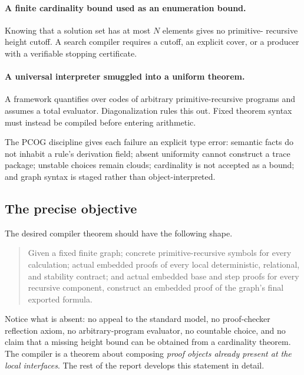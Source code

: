 \paragraph{A finite cardinality bound used as an enumeration bound.}
Knowing that a solution set has at most \(N\) elements gives no primitive-
recursive height cutoff.  A search compiler requires a cutoff, an explicit
cover, or a producer with a verifiable stopping certificate.

\paragraph{A universal interpreter smuggled into a uniform theorem.}
A framework quantifies over codes of arbitrary primitive-recursive programs
and assumes a total evaluator.  Diagonalization rules this out.  Fixed theorem
syntax must instead be compiled before entering arithmetic.

The PCOG discipline gives each failure an explicit type error: semantic facts
do not inhabit a rule's derivation field; absent uniformity cannot construct a
trace package; unstable choices remain clouds; cardinality is not accepted as
a bound; and graph syntax is staged rather than object-interpreted.

\subsection{The precise objective}

The desired compiler theorem should have the following shape.

\begin{quote}
Given a fixed finite graph; concrete primitive-recursive symbols for every
calculation; actual embedded proofs of every local deterministic,
relational, and stability contract; and actual embedded base and step proofs
for every recursive component, construct an embedded proof of the graph's
final exported formula.
\end{quote}

Notice what is absent: no appeal to the standard model, no proof-checker
reflection axiom, no arbitrary-program evaluator, no countable choice, and no
claim that a missing height bound can be obtained from a cardinality theorem.
The compiler is a theorem about composing \emph{proof objects already present
at the local interfaces}.  The rest of the report develops this statement in
detail.
